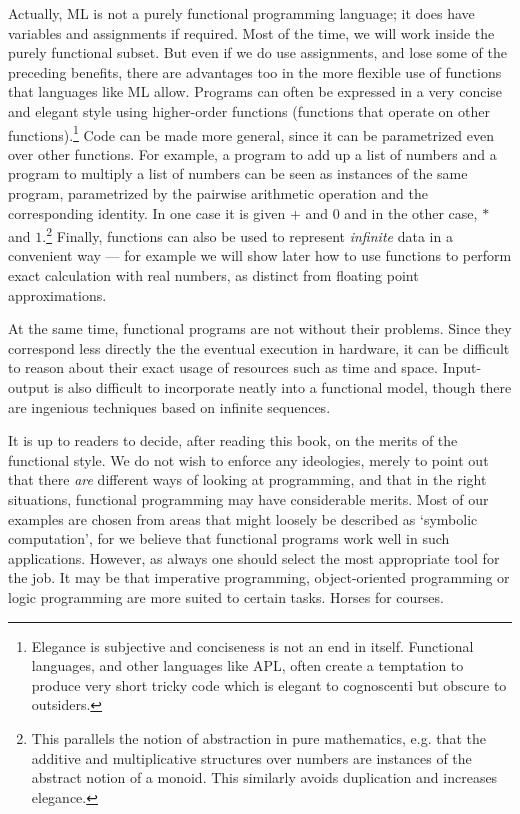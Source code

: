 Actually, ML is not a purely functional programming language; it does have
variables and assignments if required. Most of the time, we will work inside
the purely functional subset. But even if we do use assignments, and lose some
of the preceding benefits, there are advantages too in the more flexible use of
functions that languages like ML allow. Programs can often be expressed in a
very concise and elegant style using higher-order functions (functions that
operate on other functions).\footnote{Elegance is subjective and conciseness is
not an end in itself. Functional languages, and other languages like APL, often
create a temptation to produce very short tricky code which is elegant to
cognoscenti but obscure to outsiders.} Code can be made more general, since it
can be parametrized even over other functions. For example, a program to add up
a list of numbers and a program to multiply a list of numbers can be seen as
instances of the same program, parametrized by the pairwise arithmetic
operation and the corresponding identity. In one case it is given $+$ and $0$
and in the other case, $*$ and $1$.\footnote{This parallels the notion of
abstraction in pure mathematics, e.g. that the additive and multiplicative
structures over numbers are instances of the abstract notion of a monoid. This
similarly avoids duplication and increases elegance.} Finally, functions can
also be used to represent {\em infinite} data in a convenient way --- for
example we will show later how to use functions to perform exact calculation
with real numbers, as distinct from floating point approximations.

At the same time, functional programs are not without their problems. Since
they correspond less directly the the eventual execution in hardware, it can be
difficult to reason about their exact usage of resources such as time and
space. Input-output is also difficult to incorporate neatly into a functional
model, though there are ingenious techniques based on infinite sequences.

It is up to readers to decide, after reading this book, on the merits of the
functional style. We do not wish to enforce any ideologies, merely to point out
that there {\em are} different ways of looking at programming, and that in the
right situations, functional programming may have considerable merits. Most of
our examples are chosen from areas that might loosely be described as `symbolic
computation', for we believe that functional programs work well in such
applications. However, as always one should select the most appropriate tool
for the job. It may be that imperative programming, object-oriented programming
or logic programming are more suited to certain tasks. Horses for courses.

